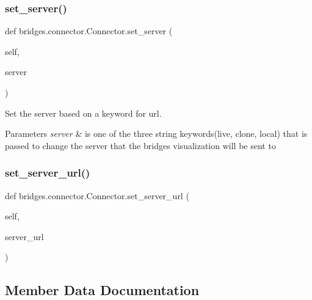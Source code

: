 \subsubsection{\texorpdfstring{set\+\_\+server()}{set\_server()}}
{\footnotesize\ttfamily def bridges.\+connector.\+Connector.\+set\+\_\+server (\begin{DoxyParamCaption}\item[{}]{self,  }\item[{}]{server }\end{DoxyParamCaption})}



Set the server based on a keyword for url. 


\begin{DoxyParams}{Parameters}
{\em server} & is one of the three string keywords(\textquotesingle{}live\textquotesingle{}, \textquotesingle{}clone\textquotesingle{}, \textquotesingle{}local\textquotesingle{}) that is passed to change the server that the bridges visualization will be sent to \\
\hline
\end{DoxyParams}
\mbox{\label{classbridges_1_1connector_1_1_connector_a6cfa754618584132754cea9a8bde5282}} 
\subsubsection{\texorpdfstring{set\+\_\+server\+\_\+url()}{set\_server\_url()}}
{\footnotesize\ttfamily def bridges.\+connector.\+Connector.\+set\+\_\+server\+\_\+url (\begin{DoxyParamCaption}\item[{}]{self,  }\item[{}]{server\+\_\+url }\end{DoxyParamCaption})}



\subsection{Member Data Documentation}
\mbox{\label{classbridges_1_1connector_1_1_connector_a2df020c062b6224d4eeb2c5407c02656}} 
